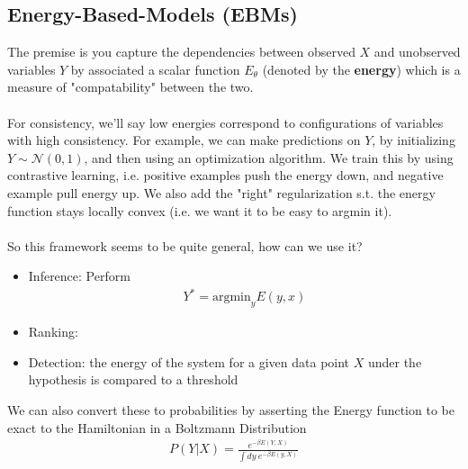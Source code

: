 \subsection{Energy-Based-Models (EBMs)}
The premise is you capture the dependencies between observed $X$ and unobserved variables $Y$ by associated a scalar function $E_\theta$ (denoted by the \textbf{energy}) which is a measure of "compatability" between the two.\\
\\
For consistency, we'll say low energies correspond to configurations of variables with high consistency. For example, we can make predictions on $Y$, by initializing $Y \sim \mathcal N(0,1)$, and then using an optimization algorithm. We train this by using contrastive learning, i.e. positive examples push the energy down, and negative example pull energy up. We also add the "right" regularization s.t. the energy function stays locally convex (i.e. we want it to be easy to argmin it).\\
\\
So this framework seems to be quite general, how can we use it?
\begin{itemize}
	\item Inference: Perform
	\begin{align}
		Y^* = \text{argmin}_y E(y,x)
	\end{align}
	\item Ranking: 
	\item Detection: the energy of the system for a given data point $X$ under the hypothesis is compared to a threshold
\end{itemize}
We can also convert these to probabilities by asserting the Energy function to be exact to the Hamiltonian in a Boltzmann Distribution
\begin{align}
	P(Y|X) = \frac{e^{-\beta E(Y,X)}}{\int dy ~ e^{-\beta E(y,X)}}
\end{align}





















